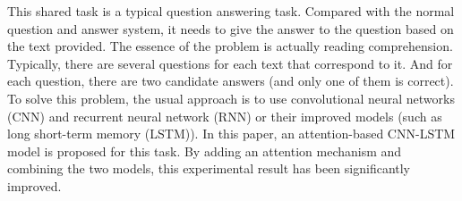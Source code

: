 This shared task is a typical question answering task. Compared with the normal question and answer system, it needs to give the answer to the question based on the text provided. The essence of the problem is actually reading comprehension. Typically, there are several questions for each text that correspond to it. And for each question, there are two candidate answers (and only one of them is correct). To solve this problem, the usual approach is to use convolutional neural networks (CNN) and recurrent neural network (RNN) or their improved models (such as long short-term memory (LSTM)). In this paper, an attention-based CNN-LSTM model is proposed for this task. By adding an attention mechanism and combining the two models, this experimental result has been significantly improved.
